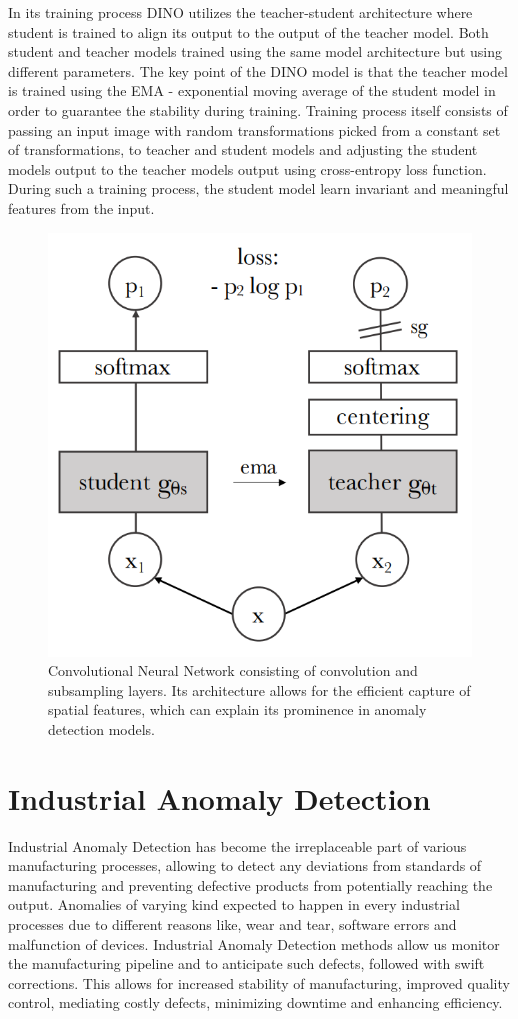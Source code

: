 In its training process DINO utilizes the teacher-student architecture where student is trained to align its output to the output of the teacher model. Both student and teacher models trained using the same model architecture but using different parameters. The key point of the DINO model is that the teacher model is trained using the EMA - exponential moving average of the student model in order to guarantee the stability during training. Training process itself consists of passing an input image with random transformations picked from a constant set of transformations, to teacher and student models and adjusting the student models output to the teacher models output using cross-entropy loss function. During such a training process, the student model learn invariant and meaningful features from the input.

\begin{figure}[t]
	\begin{center}
		\includegraphics[width=0.5\linewidth]{Chapter_2/dino.png}
	\end{center}
	\caption{Convolutional Neural Network consisting of convolution and subsampling layers. Its architecture allows for the efficient capture of spatial features, which can explain its prominence in anomaly detection models.}
	\label{fig:cnn}
\end{figure}

\section{Industrial Anomaly Detection}
\label{iad}

Industrial Anomaly Detection has become the irreplaceable part of various manufacturing processes, allowing to detect any deviations from standards of manufacturing and preventing defective products from potentially reaching the output. Anomalies of varying kind expected to happen in every industrial processes due to different reasons like, wear and tear, software errors and malfunction of devices. Industrial Anomaly Detection methods allow us monitor the manufacturing pipeline and to anticipate such defects, followed with swift corrections. This allows for increased stability of manufacturing, improved quality control, mediating costly defects, minimizing downtime and enhancing efficiency.

